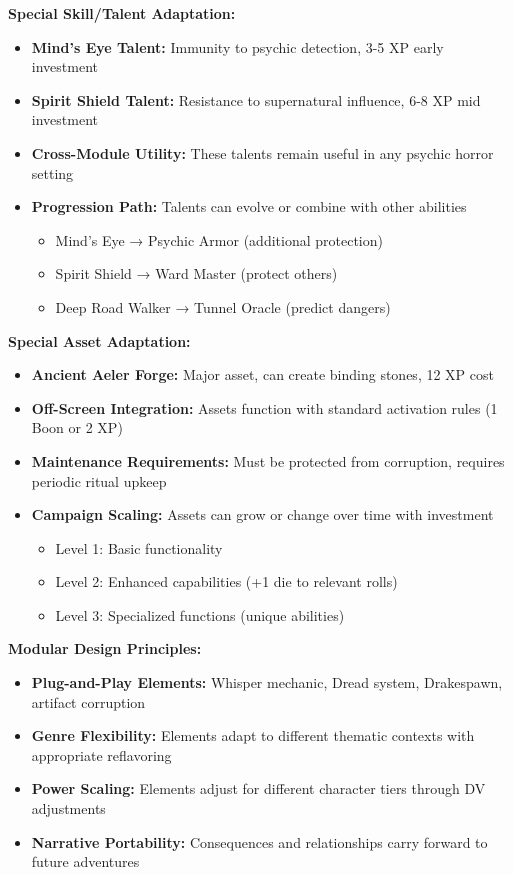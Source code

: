 \documentclass[11pt]{article}
\begin{document}
\textbf{Special Skill/Talent Adaptation:}
\begin{itemize}
\item \textbf{Mind's Eye Talent:} Immunity to psychic detection, 3-5 XP early investment
\item \textbf{Spirit Shield Talent:} Resistance to supernatural influence, 6-8 XP mid investment
\item \textbf{Cross-Module Utility:} These talents remain useful in any psychic horror setting
\item \textbf{Progression Path:} Talents can evolve or combine with other abilities
  \begin{itemize}
  \item Mind's Eye → Psychic Armor (additional protection)
  \item Spirit Shield → Ward Master (protect others)
  \item Deep Road Walker → Tunnel Oracle (predict dangers)
  \end{itemize}
\end{itemize}

\textbf{Special Asset Adaptation:}
\begin{itemize}
\item \textbf{Ancient Aeler Forge:} Major asset, can create binding stones, 12 XP cost
\item \textbf{Off-Screen Integration:} Assets function with standard activation rules (1 Boon or 2 XP)
\item \textbf{Maintenance Requirements:} Must be protected from corruption, requires periodic ritual upkeep
\item \textbf{Campaign Scaling:} Assets can grow or change over time with investment
  \begin{itemize}
  \item Level 1: Basic functionality
  \item Level 2: Enhanced capabilities (+1 die to relevant rolls)
  \item Level 3: Specialized functions (unique abilities)
  \end{itemize}
\end{itemize}

\textbf{Modular Design Principles:}
\begin{itemize}
\item \textbf{Plug-and-Play Elements:} Whisper mechanic, Dread system, Drakespawn, artifact corruption
\item \textbf{Genre Flexibility:} Elements adapt to different thematic contexts with appropriate reflavoring
\item \textbf{Power Scaling:} Elements adjust for different character tiers through DV adjustments
\item \textbf{Narrative Portability:} Consequences and relationships carry forward to future adventures
\end{itemize}
\end{document}
